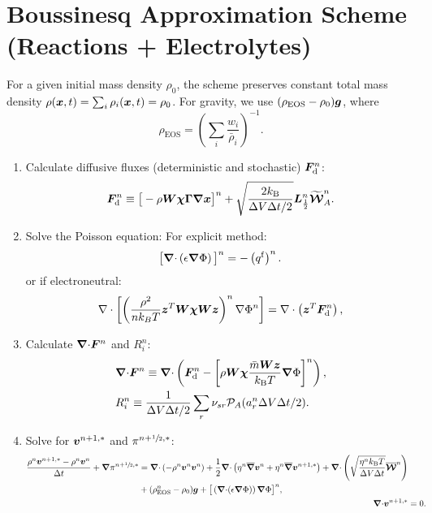 \documentclass[
10pt
showpacs, showkeys,
amsmath,amssymb,
aps,
pre,
floatfix,
]{revtex4-1}
\newcommand{\divg}{{\V\nabla\cdot}}                       %
\begin{document}
\section*{Boussinesq Approximation Scheme (Reactions + Electrolytes)}

\noindent For a given initial mass density $\rho_0$, the scheme preserves constant total mass density $\rho(\boldsymbol{x},t)=\sum_i \rho_i(\boldsymbol{x},t)=\rho_0$.
For gravity, we use $(\rho_\mathrm{EOS} - \rho_0)\boldsymbol{g}$, where
\begin{equation}
\rho_\mathrm{EOS} = \left(\sum_i \frac{w_i}{\bar{\rho}_i}\right)^{-1}.
\end{equation}

\begin{enumerate}

\item Calculate diffusive fluxes (deterministic and stochastic) $\boldsymbol{F}_\mathrm{d}^n$:
\begin{equation}
\boldsymbol{F}_\mathrm{d}^n \equiv \big[-\rho\boldsymbol{W}\boldsymbol{\chi}\boldsymbol{\Gamma}\boldsymbol{\nabla}\boldsymbol{x}\big]^n + \sqrt{ \frac{2k_\mathrm{B}}{\Delta V\Delta t/2} } \boldsymbol{L}^n_{\frac12} \widetilde{\boldsymbol{\mathcal{W}}}^n_A.
\end{equation}

\item Solve the Poisson equation:
For explicit method:
\begin{equation}
\big[\divg\left(\epsilon\grad\Phi\right)\big]^n = - \left(q^\mathrm{f}\right)^n.
\end{equation}
or if electroneutral:
\begin{equation}
 \nabla \cdot \left[ \left(\frac{\rho^2}{n k_B T} \boldsymbol{z}^T \boldsymbol{W} \boldsymbol{\chi} \boldsymbol{W} \boldsymbol{z}\right)^n \nabla \Phi^{n} \right] = 
 \nabla \cdot \left( \boldsymbol{z}^T \boldsymbol{F}_\mathrm{d}^n \right),
\end{equation}


\item Calculate $\divg\V{F}^n$ and $R^n_i$:
\begin{align}
& \divg\V{F}^n \equiv \divg \left( \V{F}_\mathrm{d}^n - \left[\rho\M{W}\V{\chi}\frac{\bar{m}\M{W}\V{z}}{k_\mathrm{B}T}\grad\Phi\right]^n \right), \\
& R^n_i \equiv \frac{1}{\D{V}\D{t}/2}\sum_r \nu_{sr}\mathcal{P}_A(a^n_r\D{V}\D{t}/2).
\end{align}

\item Solve for $\boldsymbol{v}^{n+1,*}$ and $\pi^{n+\sfrac{1}{2},*}$:
\begin{align}
\label{boussinesq_stokes_v_1st}
\begin{split}
\frac{\rho^n\V{v}^{n+1,*}-\rho^n\V{v}^n}{\D{t}} + \grad\pi^{n+\myhalf,*}
& = \divg\left(-\rho^n\V{v}^n\V{v}^n\right) + 
\frac{1}{2}\divg\left( \eta^n \overline{\grad}\V{v}^n + \eta^n \overline{\grad}\V{v}^{n+1,*} \right)
+ \divg\left( \sqrt{\frac{\eta^n k_\mathrm{B}T}{\D{V}\D{t}} } \overline{\V{\mathcal{W}}}^n \right)
\\
& + (\rho^n_\mathrm{EOS}-\rho_0)\V{g} +\big[\left(\divg(\epsilon\grad\Phi)\right)\grad\Phi\big]^n,
\end{split}
\\
\label{boussinesq_stokes_p_1st}
\divg\V{v}^{n+1,*} & = 0.
\end{align}


\end{enumerate}
\end{document}
